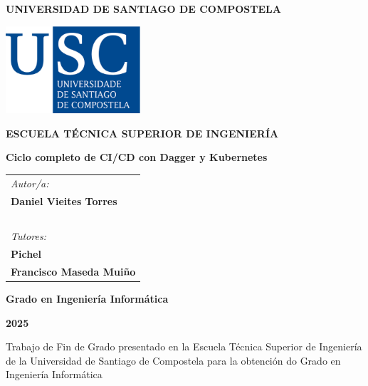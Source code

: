 \pagestyle{empty}
\begin{center}
	{\bf\Large UNIVERSIDAD DE SANTIAGO DE COMPOSTELA}
	
	\vspace{0.5cm}
	\includegraphics[width=5cm]{figuras/logo_usc.eps}
	
	\vspace{0.5cm}
	{\bf\large ESCUELA TÉCNICA SUPERIOR DE INGENIERÍA}
	
	\vspace{3cm}
	{\bf\LARGE Ciclo completo de CI/CD con Dagger y Kubernetes}
	
\end{center}

\vspace{2cm}
\hspace{4cm}\begin{tabular}{l}
	{\it\Large Autor/a:} \\
	{\bf\Large Daniel Vieites Torres} \\
	~ \\
	{\it\Large Tutores:} \\
	{\bf\Large Pichel} \\
	{\bf\Large Francisco Maseda Muiño} \\
\end{tabular}

\vspace{2cm}
\begin{center}
	{\bf\Large Grado en Ingeniería Informática}
	
	\vspace{0.5cm}
	{\bf\large  2025}
	
	\vspace{0.5cm}
	Trabajo de Fin de Grado presentado en la Escuela Técnica Superior de Ingeniería de la Universidad de Santiago de Compostela para la obtención do Grado en Ingeniería Informática
\end{center}

